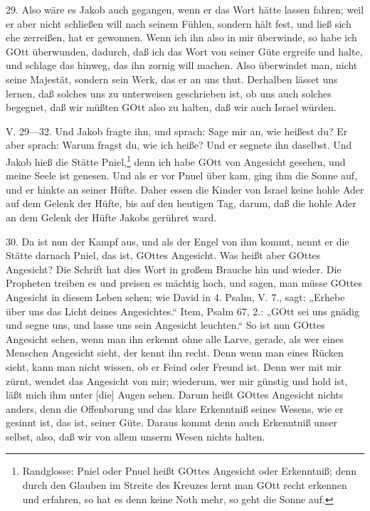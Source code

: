 29. Also wäre es Jakob auch gegangen, wenn er das Wort hätte lassen fahren; weil er aber nicht schließen will nach seinem Fühlen, sondern hält fest, und ließ sich ehe zerreißen, hat er gewonnen. Wenn ich ihn also in mir überwinde, so habe ich GOtt überwunden, dadurch, daß ich das Wort von seiner Güte ergreife und halte, und schlage das hinweg, das ihn zornig will machen. Also überwindet man, nicht seine Majestät, sondern sein Werk, das er an uns thut. Derhalben lässet uns lernen, daß solches uns zu unterweisen geschrieben ist, ob uns auch solches begegnet, daß wir müßten GOtt also zu halten, daß wir auch Israel würden.

\begin{schriftzitat}
V. 29—32. Und Jakob fragte ihn, und sprach: Sage mir an, wie heißest du? Er aber sprach: Warum fragst du, wie ich heiße? Und er segnete ihn daselbst. Und Jakob hieß die Stätte Pniel,\footnote{Randglosse: Pniel oder Pnuel heißt GOttes Angesicht oder Erkenntniß; denn durch den Glauben im Streite des Kreuzes lernt man GOtt recht erkennen und erfahren, so hat es denn keine Noth mehr, so geht die Sonne auf.} denn ich habe GOtt von Angesicht gesehen, und meine Seele ist genesen. Und als er vor Pnuel über kam, ging ihm die Sonne auf, und er hinkte an seiner Hüfte. Daher essen die Kinder von Israel keine hohle Ader auf dem Gelenk der Hüfte, bis auf den heutigen Tag, darum, daß die hohle Ader an dem Gelenk der Hüfte Jakobs gerühret ward.
\end{schriftzitat}


30. Da ist nun der Kampf aus, und als der Engel von ihm kommt, nennt er die Stätte darnach Pniel, das ist, GOttes Angesicht. Was heißt aber GOttes Angesicht? Die Schrift hat dies Wort in großem Brauche hin und wieder. Die Propheten treiben es und preisen es mächtig hoch, und sagen, man müsse GOttes Angesicht in diesem Leben sehen; wie David in 4. Psalm, V. 7., sagt: „Erhebe über uns das Licht deines Angesichtes.“ Item, Psalm 67, 2.: „GOtt sei uns gnädig und segne uns, und lasse uns sein Angesicht leuchten.“ So ist nun GOttes Angesicht sehen, wenn man ihn erkennt ohne alle Larve, gerade, als wer eines Menschen Angesicht sieht, der kennt ihn recht. Denn wenn man eines Rücken sieht, kann man nicht wissen, ob er Feind oder Freund ist. Denn wer mit mir zürnt, wendet das Angesicht von mir; wiederum, wer mir günstig und hold ist, läßt mich ihm unter [die] Augen sehen. Darum heißt GOttes Angesicht nichts anders, denn die Offenbarung und das klare Erkenntniß seines Wesens, wie er gesinnt ist, das ist, seiner Güte. Daraus kommt denn auch Erkenntniß unser selbst, also, daß wir von allem unserm Wesen nichts halten.

